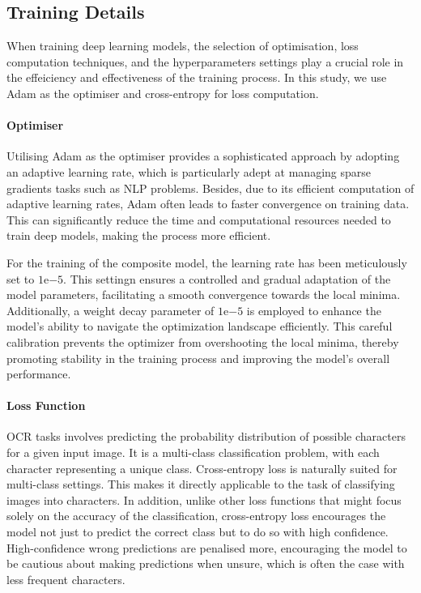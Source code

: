 \subsection{Training Details}
\label{subsec:4_training_details}
When training deep learning models, the selection of optimisation, loss computation techniques, and the hyperparameters settings play a crucial role in the effeiciency and effectiveness of the training process. In this study, we use Adam as the optimiser and cross-entropy for loss computation.

\paragraph*{Optimiser}
\label{par:4_Optimiser}
Utilising Adam as the optimiser provides a sophisticated approach by adopting an adaptive learning rate, which is particularly adept at managing sparse gradients tasks such as NLP problems. Besides, due to its efficient computation of adaptive learning rates, Adam often leads to faster convergence on training data. This can significantly reduce the time and computational resources needed to train deep models, making the process more efficient.

For the training of the composite model, the learning rate has been meticulously set to $1\mathrm{e}{-5}$. This settingn ensures a controlled and gradual adaptation of the model parameters, facilitating a smooth convergence towards the local minima. Additionally, a weight decay parameter of $1\mathrm{e}{-5}$ is employed to enhance the model's ability to navigate the optimization landscape efficiently. This careful calibration prevents the optimizer from overshooting the local minima, thereby promoting stability in the training process and improving the model's overall performance.

\paragraph*{Loss Function}
\label{par:4_loss_function}
OCR tasks involves predicting the probability distribution of possible characters for a given input image. It is a multi-class classification problem, with each character representing a unique class. Cross-entropy loss is naturally suited for multi-class settings. This makes it directly applicable to the task of classifying images into characters. In addition, unlike other loss functions that might focus solely on the accuracy of the classification, cross-entropy loss encourages the model not just to predict the correct class but to do so with high confidence. High-confidence wrong predictions are penalised more, encouraging the model to be cautious about making predictions when unsure, which is often the case with less frequent characters.
